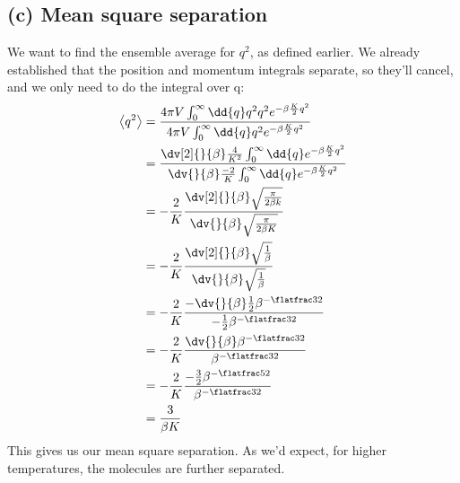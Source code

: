 \documentclass[../../PS3.tex]{subfiles}
\begin{document}
\subsection*{(c) Mean square separation} 
We want to find the ensemble average for $q^2$, as defined earlier. We already established that the position and momentum integrals separate, so they'll cancel, and we only need to do the integral over q:
\begin{align}
	\left<q^2\right> &= \frac{4\pi V \int_0^{\infty} \dd{q} q^2 q^2 e^{-\beta \frac{K}{2} q^2 }} {4\pi V \int_0^{\infty} \dd{q} q^2 e^{-\beta \frac{K}{2} q^2 } } \\
	&= \frac{\dv[2]{}{\beta} \frac{4}{K^2} \int_0^{\infty} \dd{q} e^{-\beta \frac{K}{2} q^2 }}{\dv{}{\beta} \frac{-2}{K} \int_0^{\infty} \dd{q} e^{-\beta \frac{K}{2} q^2 }} \\
	&= -\frac{2}{K} \frac{\dv[2]{}{\beta} \sqrt{\frac{\pi}{2 \beta k}}}{\dv{}{\beta} \sqrt{\frac{\pi}{2 \beta K}}} \\
	&= -\frac{2}{K} \frac{\dv[2]{}{\beta} \sqrt{\frac{1}{ \beta }}}{\dv{}{\beta} \sqrt{\frac{1}{\beta}}} \\
	&=- \frac{2}{K} \frac{- \dv{}{\beta} \frac12 \beta^{-\flatfrac32}}{-\frac12 \beta^{-\flatfrac32}} \\
	&= -\frac{2}{K} \frac{ \dv{}{\beta} \beta^{-\flatfrac32}}{ \beta^{-\flatfrac32}} \\
	&= -\frac{2}{K} \frac{- \frac{3}{2} \beta^{-\flatfrac52}}{ \beta^{-\flatfrac32}} \\
	&= \frac{3}{\beta K}
\end{align}
This gives us our mean square separation. As we'd expect, for higher temperatures, the molecules are further separated.
\end{document}
